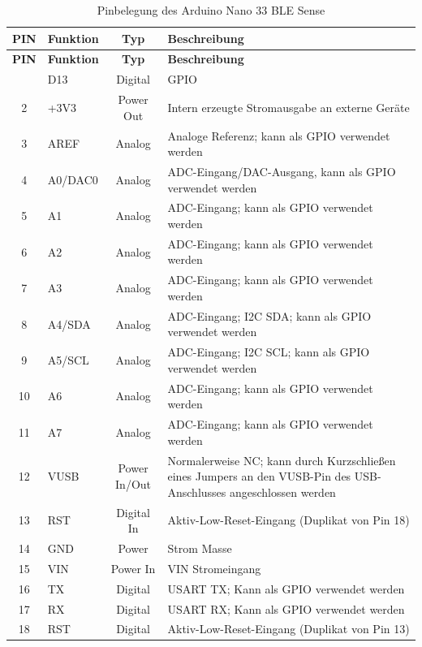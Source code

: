\begin{longtable}{|c|p{2cm}|c|p{6.5cm}|}
	\caption{Pinbelegung des Arduino Nano 33 BLE Sense\cite{Arduino:2021}}
	\label{tab:Pinbelegung} \\
	\hline
	\textbf{PIN} & \textbf{Funktion} & \textbf{Typ} & \textbf{Beschreibung} \\
	\hline
	\endfirsthead
	\hline
	\textbf{PIN} & \textbf{Funktion} & \textbf{Typ} & \textbf{Beschreibung} \\
	\hline
	\endhead
	\hline
	\endfoot
	
	\hline
	1 & D13 & Digital & GPIO\\
	\hline
	2 & +3V3 & Power Out & Intern erzeugte Stromausgabe an externe Geräte \\
	\hline
	3 & AREF & Analog & Analoge Referenz; kann als GPIO verwendet werden \\
	\hline
	4 & A0/DAC0 & Analog & ADC-Eingang/DAC-Ausgang, kann als GPIO verwendet werden\\
	\hline
	5 & A1 & Analog & ADC-Eingang; kann als GPIO verwendet werden \\
	\hline
	6 & A2 & Analog & ADC-Eingang; kann als GPIO verwendet werden\\
	\hline
	7 & A3 & Analog & ADC-Eingang; kann als GPIO verwendet werden \\
	\hline
	8 & A4/SDA & Analog & ADC-Eingang; I2C SDA; kann als GPIO verwendet werden \\
	\hline
	9 & A5/SCL & Analog & ADC-Eingang; I2C SCL; kann als GPIO verwendet werden \\
	\hline
	10 & A6 & Analog & ADC-Eingang; kann als GPIO verwendet werden \\
	\hline
	11 & A7 & Analog & ADC-Eingang; kann als GPIO verwendet werden \\
	\hline
	12 & VUSB & Power In/Out & Normalerweise NC; kann durch Kurzschließen eines Jumpers an den VUSB-Pin des USB-Anschlusses angeschlossen werden \\
	\hline
	13 & RST & Digital In & Aktiv-Low-Reset-Eingang (Duplikat von Pin 18)\\
	\hline
	14 & GND & Power & Strom Masse \\
	\hline
	15 & VIN & Power In & VIN Stromeingang \\
	\hline
	16 & TX & Digital & USART TX; Kann als GPIO verwendet werden \\
	\hline
	17 & RX & Digital & USART RX; Kann als GPIO verwendet werden \\
	\hline
	18 & RST & Digital & Aktiv-Low-Reset-Eingang (Duplikat von Pin 13) \\

\end{longtable}
